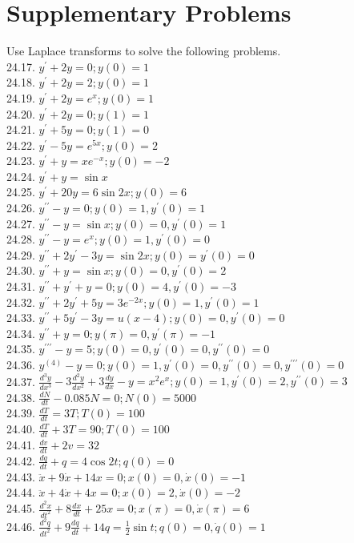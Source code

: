 \documentclass[10pt]{article}
\begin{document}
\section*{Supplementary Problems}
Use Laplace transforms to solve the following problems.\\
24.17. $y^{\prime}+2 y=0 ; y(0)=1$\\
24.18. $y^{\prime}+2 y=2 ; y(0)=1$\\
24.19. $y^{\prime}+2 y=e^{x} ; y(0)=1$\\
24.20. $y^{\prime}+2 y=0 ; y(1)=1$\\
24.21. $y^{\prime}+5 y=0 ; y(1)=0$\\
24.22. $y^{\prime}-5 y=e^{5 x} ; y(0)=2$\\
24.23. $y^{\prime}+y=x e^{-x} ; y(0)=-2$\\
24.24. $y^{\prime}+y=\sin x$\\
24.25. $y^{\prime}+20 y=6 \sin 2 x ; y(0)=6$\\
24.26. $y^{\prime \prime}-y=0 ; y(0)=1, y^{\prime}(0)=1$\\
24.27. $y^{\prime \prime}-y=\sin x ; y(0)=0, y^{\prime}(0)=1$\\
24.28. $y^{\prime \prime}-y=e^{x} ; y(0)=1, y^{\prime}(0)=0$\\
24.29. $y^{\prime \prime}+2 y^{\prime}-3 y=\sin 2 x ; y(0)=y^{\prime}(0)=0$\\
24.30. $y^{\prime \prime}+y=\sin x ; y(0)=0, y^{\prime}(0)=2$\\
24.31. $y^{\prime \prime}+y^{\prime}+y=0 ; y(0)=4, y^{\prime}(0)=-3$\\
24.32. $y^{\prime \prime}+2 y^{\prime}+5 y=3 e^{-2 x} ; y(0)=1, y^{\prime}(0)=1$\\
24.33. $y^{\prime \prime}+5 y^{\prime}-3 y=u(x-4) ; y(0)=0, y^{\prime}(0)=0$\\
24.34. $y^{\prime \prime}+y=0 ; y(\pi)=0, y^{\prime}(\pi)=-1$\\
24.35. $y^{\prime \prime \prime}-y=5 ; y(0)=0, y^{\prime}(0)=0, y^{\prime \prime}(0)=0$\\
24.36. $y^{(4)}-y=0 ; y(0)=1, y^{\prime}(0)=0, y^{\prime \prime}(0)=0, y^{\prime \prime \prime}(0)=0$\\
24.37. $\frac{d^{3} y}{d x^{3}}-3 \frac{d^{2} y}{d x^{2}}+3 \frac{d y}{d x}-y=x^{2} e^{x} ; y(0)=1, y^{\prime}(0)=2, y^{\prime \prime}(0)=3$\\
24.38. $\frac{d N}{d t}-0.085 N=0 ; N(0)=5000$\\
24.39. $\frac{d T}{d t}=3 T ; T(0)=100$\\
24.40. $\frac{d T}{d t}+3 T=90 ; T(0)=100$\\
24.41. $\frac{d v}{d t}+2 v=32$\\
24.42. $\frac{d q}{d t}+q=4 \cos 2 t ; q(0)=0$\\
24.43. $\ddot{x}+9 \dot{x}+14 x=0 ; x(0)=0, \dot{x}(0)=-1$\\
24.44. $\ddot{x}+4 \dot{x}+4 x=0 ; x(0)=2, \dot{x}(0)=-2$\\
24.45. $\frac{d^{2} x}{d t^{2}}+8 \frac{d x}{d t}+25 x=0 ; x(\pi)=0, \dot{x}(\pi)=6$\\
24.46. $\frac{d^{2} q}{d t^{2}}+9 \frac{d q}{d t}+14 q=\frac{1}{2} \sin t ; q(0)=0, \dot{q}(0)=1$
\end{document}
